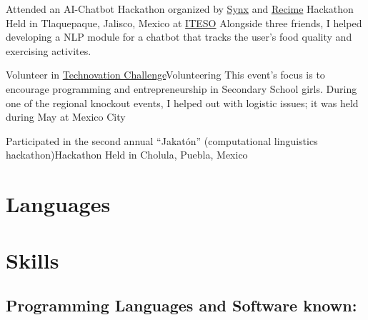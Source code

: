 \documentclass[11pt,a4paper,sans]{moderncv} %
\begin{document}
        {Attended an AI-Chatbot Hackathon organized by \href{http://synx.co}{Synx} and \href{https://www.recime.io}{Recime}}
        {Hackathon}
        {Held in Tlaquepaque, Jalisco, Mexico at \href{http://www.iteso.mx}{ITESO}}{}
        {Alongside three friends, I helped developing a NLP module for a chatbot that tracks the user's food quality and exercising activites.}

        {Volunteer in \href{http://technovationmx.org}{Technovation Challenge}}{Volunteering}
        {This event's focus is to encourage programming and entrepreneurship in Secondary School girls. During one of the regional knockout events, I helped out with logistic issues; it was held during May at Mexico City}
        {}{}

        {Participated in the second annual ``Jakatón'' (computational linguistics hackathon)}{Hackathon}
        {Held in Cholula, Puebla, Mexico}{}{}




\section{Languages}



\section{Skills}

\renewcommand{\listitemsymbol}{-~}
\subsection{Programming Languages and Software known:}
\end{document}
